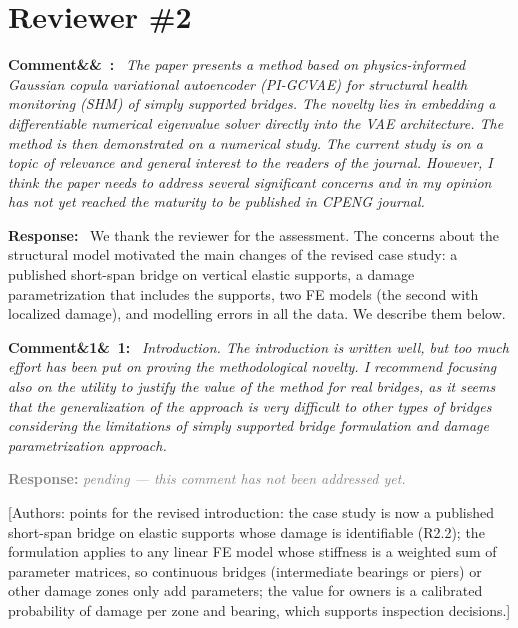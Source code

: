 \documentclass[11pt]{article}
\newenvironment{rcomment}[1]{\par\bigskip\noindent\textbf{Comment\ifx&#1&\else\ #1\fi:}\ \itshape}{\par}
\newenvironment{response}{\par\smallskip\noindent\color{resp}\textbf{Response:}\ }{\par}
\newcommand{\pending}{\par\smallskip\noindent\textcolor{gray}{\textbf{Response:} \textit{pending --- this comment
has not been addressed yet.}}\par}
\newcommand{\authornote}[1]{\textcolor{note}{\textsf{[Authors: #1]}}}
\begin{document}
\section{Reviewer \#2}

\begin{rcomment}{}
The paper presents a method based on physics-informed Gaussian copula variational autoencoder (PI-GCVAE) for
structural health monitoring (SHM) of simply supported bridges. The novelty lies in embedding a differentiable numerical
eigenvalue solver directly into the VAE architecture. The method is then demonstrated on a numerical study. The current
study is on a topic of relevance and general interest to the readers of the journal. However, I think the paper needs to
address several significant concerns and in my opinion has not yet reached the maturity to be published in CPENG
journal.
\end{rcomment}

\begin{response}
We thank the reviewer for the assessment. The concerns about the structural model motivated the main changes of the
revised case study: a published short-span bridge on vertical elastic supports, a
damage parametrization that includes the supports, two FE models (the second with localized damage), and modelling
errors in all the data. We describe them below.
\end{response}

\begin{rcomment}{1}
Introduction. The introduction is written well, but too much effort has been put on proving the methodological
novelty. I recommend focusing also on the utility to justify the value of the method for real bridges, as it seems that
the generalization of the approach is very difficult to other types of bridges considering the limitations of simply
supported bridge formulation and damage parametrization approach.
\end{rcomment}
\pending
\authornote{points for the revised introduction: the case study is now a published short-span bridge on elastic supports
whose damage is identifiable (R2.2); the formulation applies to any linear FE model whose stiffness is a weighted sum of
parameter matrices, so continuous bridges (intermediate bearings or piers) or other damage zones only add parameters;
the value for owners is a calibrated probability of damage per zone and bearing, which supports inspection
decisions.}
\end{document}
